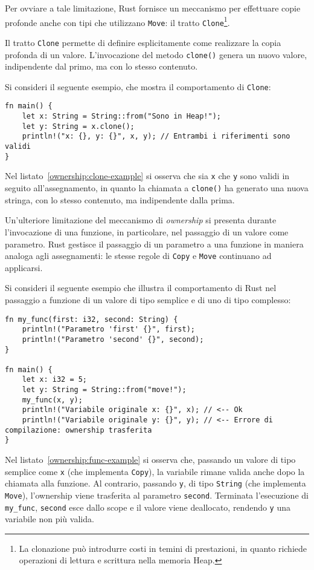 Per ovviare a tale limitazione, Rust fornisce un meccanismo per effettuare copie profonde anche con tipi che utilizzano \texttt{Move}: il tratto \texttt{Clone}\footnote{La clonazione può introdurre costi in temini di prestazioni, in quanto richiede operazioni di lettura e scrittura nella memoria Heap.}.

Il tratto \texttt{Clone} permette di definire esplicitamente come realizzare la copia profonda di un valore. L'invocazione del metodo \texttt{clone()} genera un nuovo valore, indipendente dal primo, ma con lo stesso contenuto.

Si consideri il seguente esempio, che mostra il comportamento di \texttt{Clone}:\hfill
\begin{lstlisting}[style=ruststyle, caption={Comportamento di Clone}, label={ownership:clone-example}]
fn main() {
    let x: String = String::from("Sono in Heap!");
    let y: String = x.clone();
    println!("x: {}, y: {}", x, y); // Entrambi i riferimenti sono validi
}
\end{lstlisting}
Nel listato~\ref{ownership:clone-example} si osserva che sia \texttt{x} che \texttt{y} sono validi in seguito all'assegnamento, in quanto la chiamata a \texttt{clone()} ha generato una nuova stringa, con lo stesso contenuto, ma indipendente dalla prima. \hfill \break

\noindent Un'ulteriore limitazione del meccanismo di \textit{ownership} si presenta durante l'invocazione di una funzione, in particolare, nel passaggio di un valore come parametro.
Rust gestisce il passaggio di un parametro a una funzione in maniera analoga agli assegnamenti: le stesse regole di \texttt{Copy} e \texttt{Move} continuano ad applicarsi.

Si consideri il seguente esempio che illustra il comportamento di Rust nel passaggio a funzione di un valore di tipo semplice e di uno di tipo complesso:
\begin{lstlisting}[style=ruststyle, caption={Trasferimento di ownership nelle chiamate a funzione}, label={ownership:func-example}]
fn my_func(first: i32, second: String) {
    println!("Parametro 'first' {}", first);
    println!("Parametro 'second' {}", second);
}

fn main() {
    let x: i32 = 5;
    let y: String = String::from("move!");
    my_func(x, y);
    println!("Variabile originale x: {}", x); // <-- Ok
    println!("Variabile originale y: {}", y); // <-- Errore di compilazione: ownership trasferita
}
\end{lstlisting}
Nel listato~\ref{ownership:func-example} si osserva che, passando un valore di tipo semplice come \texttt{x} (che implementa \texttt{Copy}), la variabile rimane valida anche dopo la chiamata alla funzione. Al contrario, passando \texttt{y}, di tipo \texttt{String} (che implementa \texttt{Move}), l'ownership viene trasferita al parametro \texttt{second}. Terminata l'esecuzione di \texttt{my\_func}, \texttt{second} esce dallo scope e il valore viene deallocato, rendendo \texttt{y} una variabile non più valida.

